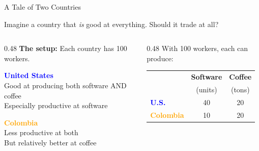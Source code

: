 \documentclass[9pt,english,aspectratio=169]{beamer}
\begin{document}

\begin{frame}{A Tale of Two Countries}

  \begin{questionbox}
    Imagine a country that \textit{is} good at everything. Should it trade at all?
  \end{questionbox}

  \pause
  \vspace{0.8em}
  \begin{columns}[T]
    \begin{column}{0.48\textwidth}
      \textbf{The setup:} Each country has 100 workers.

      \vspace{1.2em}
      \textcolor{blue}{\textbf{United States}}\\
      Good at producing both software AND coffee\\
      {\small Especially productive at software}

      \vspace{1.2em}
      \textcolor{orange}{\textbf{Colombia}}\\
      Less productive at both\\
      {\small But relatively better at coffee} \pause
    \end{column}
    \begin{column}{0.48\textwidth}
      \vspace{0.5em}
      {\small With 100 workers, each can produce:}

      \vspace{0.8em}
      \begin{tabular}{@{} l c c @{}}
        \toprule
        & \textbf{Software} & \textbf{Coffee} \\
        & (units) & (tons) \\
        \midrule
        \textcolor{blue}{\textbf{U.S.}} & 40 & 20 \\
        \textcolor{orange}{\textbf{Colombia}} & 10 & 20 \\
        \bottomrule
      \end{tabular}

    \end{column}
  \end{columns}

\end{frame}
\end{document}
